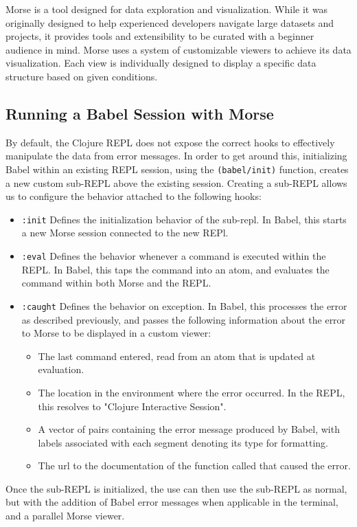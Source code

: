 \documentclass[12pt]{article}
\begin{document}
Morse is a tool designed for data exploration and visualization.
While it was originally designed to help experienced developers navigate large datasets and projects, 
it provides tools and extensibility to be curated with a beginner audience in mind.
Morse uses a system of customizable viewers to achieve its data visualization.
Each view is individually designed to display a specific data structure based on given conditions.

\subsection{Running a Babel Session with Morse}\label{subsec:babel-w-morse}

By default, the Clojure REPL does not expose the correct hooks to effectively manipulate the data from error messages.
In order to get around this, initializing Babel within an existing REPL session, using the \texttt{(babel/init)} function, creates a new custom sub-REPL above the existing session.
Creating a sub-REPL allows us to configure the behavior attached to the following hooks:
\begin{itemize}
	\item \texttt{:init} Defines the initialization behavior of the sub-repl. 
		In Babel, this starts a new Morse session connected to the new REPl.
	\item \texttt{:eval} Defines the behavior whenever a command is executed within the REPL. 
		In Babel, this taps the command into an atom, and evaluates the command within both Morse and the REPL.
	\item \texttt{:caught} Defines the behavior on exception.
		In Babel, this processes the error as described previously, 
			and passes the following information about the error to Morse to be displayed in a custom viewer:
			\begin{itemize}
				\item The last command entered, read from an atom that is updated at evaluation.
				\item The location in the environment where the error occurred. In the REPL, this resolves to "Clojure Interactive Session".
				\item A vector of pairs containing the error message produced by Babel, with labels associated with each segment denoting its type for formatting.
				\item The url to the documentation of the function called that caused the error. 
			\end{itemize}
\end{itemize}
Once the sub-REPL is initialized, the use can then use the sub-REPL as normal, but with the addition of Babel error messages when applicable in the terminal, and a parallel Morse viewer.
\end{document}
